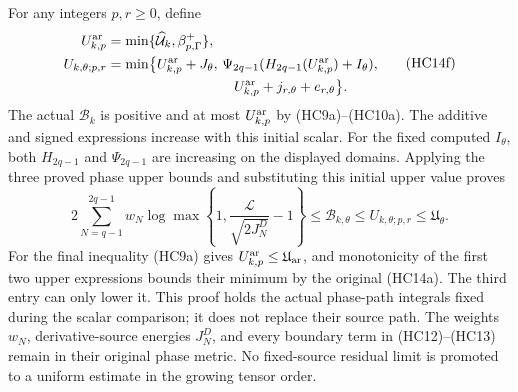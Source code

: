 For any integers $p,r\ge0$, define
\[
\begin{aligned}
 U_{k,p}^{\rm ar}
 &=\min\{\widehat{\mathcal U}_k,\beta_{p,\Gamma}^+\},\\
 U_{k,\theta;p,r}
 &=\min\bigl\{
 U_{k,p}^{\rm ar}+J_\theta,\,
 \Psi_{2q-1}(H_{2q-1}(U_{k,p}^{\rm ar})+I_\theta),\\
 &\hspace{32mm}U_{k,p}^{\rm ar}+j_{r,\theta}+e_{r,\theta}
 \bigr\}.
\end{aligned}\tag{HC14f}
\]
The actual $\mathcal B_k$ is positive and at most
$U_{k,p}^{\rm ar}$ by (HC9a)--(HC10a).
The additive and signed expressions increase with this initial
scalar. For the fixed computed $I_\theta$, both $H_{2q-1}$
and $\Psi_{2q-1}$ are increasing on the displayed domains.
Applying the three proved phase upper bounds and substituting
this initial upper value proves
\[
 2\sum_{N=q-1}^{2q-1}w_N
 \log\max\left\{1,\frac{\mathcal L}{\sqrt{2J_N^D}}-1\right\}
 \le\mathcal B_{k,\theta}
 \le U_{k,\theta;p,r}\le\mathfrak U_\theta .
\tag{HC13a}
\]
For the final inequality (HC9a) gives
$U_{k,p}^{\rm ar}\le\mathfrak U_{\rm ar}$, and monotonicity
of the first two upper expressions bounds their minimum by
the original (HC14a). The third entry can only lower it.
This proof holds the actual phase-path integrals fixed during
the scalar comparison; it does not replace their source path.
The weights $w_N$, derivative-source energies $J_N^D$, and every
boundary term in (HC12)--(HC13) remain in their original phase
metric. No fixed-source residual limit is promoted to a
uniform estimate in the growing tensor order.

